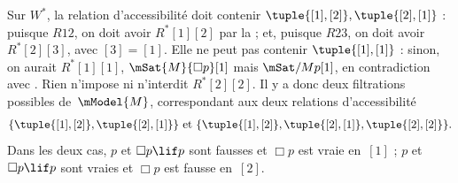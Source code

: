 \documentclass[../../../include/open-logic-section]{subfiles}
\begin{document}
\begin{ex}
  Sur $W^*$, la relation d'accessibilité doit contenir
  $\tuple{[1], [2]}, \tuple{[2],[1]}$ : puisque $R12$,
  on doit avoir $R^*[1][2]$ par la
   ; et,
  puisque $R23$, on doit avoir $R^*[2][3]$, avec $[3]=[1]$. Elle ne
  peut pas contenir $\tuple{[1],[1]}$ : sinon, on aurait
  $R^*[1][1]$, $\mSat{M}{\Box p}[1]$ mais
  $\mSat/{M}{p}[1]$, en contradiction avec
  . Rien n'impose ni n'interdit
  $R^*[2][2]$. Il y a donc deux filtrations possibles de~$\mModel{M}$,
  correspondant aux deux relations d'accessibilité
  \[
  \{\tuple{[1],[2]}, \tuple{[2],[1]}\} \text{ et }
  \{\tuple{[1],[2]}, \tuple{[2],[1]}, \tuple{[2],[2]}\}.
  \]
  Dans les deux cas, $p$ et $\Box p \lif p$ sont fausses et
  $\Box p$ est vraie en~$[1]$ ; $p$ et $\Box p \lif p$ sont vraies et
  $\Box p$ est fausse en~$[2]$.
\end{ex}
\end{document}
